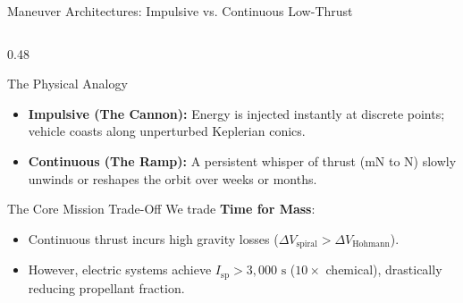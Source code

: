 \documentclass[aspectratio=169, 10pt]{beamer}
\begin{document}
\begin{frame}{Maneuver Architectures: Impulsive vs. Continuous Low-Thrust}
    \begin{columns}[T]
        \begin{column}{0.48\textwidth}
            \begin{block}{The Physical Analogy}
                \scriptsize
                \begin{itemize}\setlength{\itemsep}{1.2pt}\setlength{\topsep}{0pt}
                    \item \textbf{Impulsive (The Cannon):} Energy is injected instantly at discrete points; vehicle coasts along unperturbed Keplerian conics.
                    \item \textbf{Continuous (The Ramp):} A persistent whisper of thrust (mN to N) slowly unwinds or reshapes the orbit over weeks or months.
                \end{itemize}
            \end{block}
            \vspace{-0.15cm}
            \begin{alertblock}{The Core Mission Trade-Off}
                \scriptsize
                We trade \textbf{Time for Mass}:
                \begin{itemize}\setlength{\itemsep}{1pt}\setlength{\topsep}{0pt}
                    \item Continuous thrust incurs high gravity losses ($\Delta V_{\text{spiral}} > \Delta V_{\text{Hohmann}}$).
                    \item However, electric systems achieve $I_{\text{sp}} > 3{,}000\text{ s}$ ($10\times$ chemical), drastically reducing propellant fraction.
                \end{itemize}
            \end{alertblock}
        \end{column}


\end{columns}
\end{frame}
\end{document}
